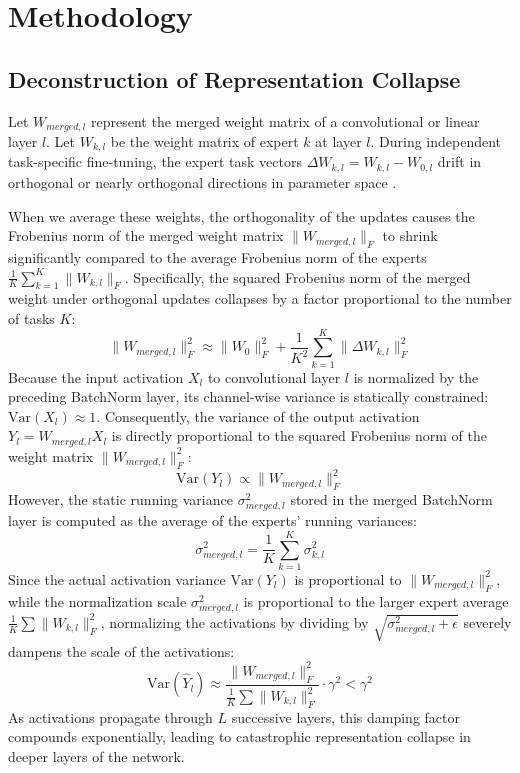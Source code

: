 \documentclass{article}
\theoremstyle{plain}
\theoremstyle{definition}
\theoremstyle{remark}
\begin{document}
\section{Methodology}
\subsection{Deconstruction of Representation Collapse}
Let $W_{merged, l}$ represent the merged weight matrix of a convolutional or linear layer $l$. Let $W_{k, l}$ be the weight matrix of expert $k$ at layer $l$. During independent task-specific fine-tuning, the expert task vectors $\Delta W_{k, l} = W_{k, l} - W_{0, l}$ drift in orthogonal or nearly orthogonal directions in parameter space \cite{confounder2026}.

When we average these weights, the orthogonality of the updates causes the Frobenius norm of the merged weight matrix $\|W_{merged, l}\|_F$ to shrink significantly compared to the average Frobenius norm of the experts $\frac{1}{K} \sum_{k=1}^K \|W_{k, l}\|_F$. Specifically, the squared Frobenius norm of the merged weight under orthogonal updates collapses by a factor proportional to the number of tasks $K$:
\begin{equation}
\|W_{merged, l}\|_F^2 \approx \|W_0\|_F^2 + \frac{1}{K^2} \sum_{k=1}^K \|\Delta W_{k, l}\|_F^2
\end{equation}
Because the input activation $X_l$ to convolutional layer $l$ is normalized by the preceding BatchNorm layer, its channel-wise variance is statically constrained: $\mathrm{Var}(X_l) \approx 1$. Consequently, the variance of the output activation $Y_l = W_{merged, l} X_l$ is directly proportional to the squared Frobenius norm of the weight matrix $\|W_{merged, l}\|_F^2$:
\begin{equation}
\mathrm{Var}(Y_l) \propto \|W_{merged, l}\|_F^2
\end{equation}
However, the static running variance $\sigma^2_{merged, l}$ stored in the merged BatchNorm layer is computed as the average of the experts' running variances:
\begin{equation}
\sigma^2_{merged, l} = \frac{1}{K} \sum_{k=1}^K \sigma^2_{k, l}
\end{equation}
Since the actual activation variance $\mathrm{Var}(Y_l)$ is proportional to $\|W_{merged, l}\|_F^2$, while the normalization scale $\sigma^2_{merged, l}$ is proportional to the larger expert average $\frac{1}{K} \sum \|W_{k, l}\|_F^2$, normalizing the activations by dividing by $\sqrt{\sigma^2_{merged, l} + \epsilon}$ severely dampens the scale of the activations:
\begin{equation}
\mathrm{Var}(\hat{Y}_l) \approx \frac{\|W_{merged, l}\|_F^2}{\frac{1}{K}\sum \|W_{k, l}\|_F^2} \cdot \gamma^2 < \gamma^2
\end{equation}
As activations propagate through $L$ successive layers, this damping factor compounds exponentially, leading to catastrophic representation collapse in deeper layers of the network.
\end{document}
